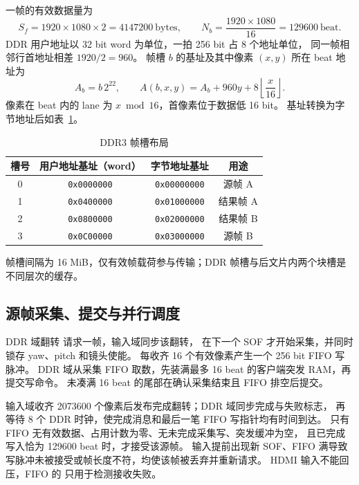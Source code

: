 一帧的有效数据量为
\begin{equation}
S_f=1920\times1080\times2=4147200\ \text{bytes},\qquad
N_b=\frac{1920\times1080}{16}=129600\ \text{beat}.
\end{equation}
DDR 用户地址以 32 bit word 为单位，一拍 256 bit 占 8 个地址单位，
同一帧相邻行首地址相差 $1920/2=960$。
帧槽 $b$ 的基址及其中像素 $(x,y)$ 所在 beat 地址为
\begin{equation}
A_b=b\,2^{22},\qquad
A(b,x,y)=A_b+960y+8\left\lfloor\frac{x}{16}\right\rfloor.
\label{eq:fpga-ddr-address}
\end{equation}
像素在 beat 内的 lane 为 $x\bmod16$，首像素位于数据低 16 bit。
基址转换为字节地址后如表~\ref{tab:fpga-banks}。
\begin{table}[htbp]\centering\small
\caption{DDR3 帧槽布局}\label{tab:fpga-banks}
\begin{tabular}{cccc}
\toprule 槽号 & 用户地址基址（word） & 字节地址基址 & 用途 \\\midrule
0 & \texttt{0x0000000} & \texttt{0x00000000} & 源帧 A\\
1 & \texttt{0x0400000} & \texttt{0x01000000} & 结果帧 A\\
2 & \texttt{0x0800000} & \texttt{0x02000000} & 结果帧 B\\
3 & \texttt{0x0C00000} & \texttt{0x03000000} & 源帧 B\\
\bottomrule
\end{tabular}
\end{table}
帧槽间隔为 16 MiB，仅有效帧载荷参与传输；DDR 帧槽与后文片内两个块槽是不同层次的缓存。

\subsection{源帧采集、提交与并行调度}
DDR 域翻转  请求一帧，输入域同步该翻转，
在下一个 SOF 才开始采集，并同时锁存 yaw、pitch 和镜头使能。
每收齐 16 个有效像素产生一个 256 bit FIFO 写脉冲。
DDR 域从采集 FIFO 取数，先装满最多 16 beat 的客户端突发 RAM，再提交写命令。
未凑满 16 beat 的尾部在确认采集结束且 FIFO 排空后提交。

输入域收齐 2073600 个像素后发布完成翻转；DDR 域同步完成与失败标志，
再等待 8 个 DDR 时钟，使完成消息和最后一笔 FIFO 写指针均有时间到达。
只有 FIFO 无有效数据、占用计数为零、无未完成采集写、突发缓冲为空，
且已完成写入恰为 129600 beat 时，才接受该源帧。
输入提前出现新 SOF、FIFO 满导致写脉冲未被接受或帧长度不符，均使该帧被丢弃并重新请求。
HDMI 输入不能回压，FIFO 的  只用于检测接收失败。

